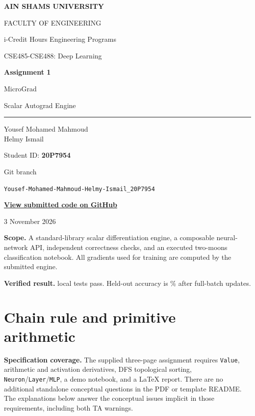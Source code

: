 \documentclass[11pt,a4paper]{article}
\newcommand{\code}[1]{\texttt{#1}}
\begin{document}
\hypersetup{pageanchor=false}
\begin{titlepage}
\centering
{\Large\bfseries AIN SHAMS UNIVERSITY\par}
{\large FACULTY OF ENGINEERING\par}
{\normalsize i-Credit Hours Engineering Programs\par}
\vspace{16mm}
{\Large CSE485-CSE488: Deep Learning\par}
\vspace{12mm}
{\Huge\bfseries\color{ink} Assignment 1\par}
\vspace{5mm}
{\LARGE MicroGrad\par}
{\Large Scalar Autograd Engine\par}
\vspace{15mm}
\rule{.8\linewidth}{.7pt}\par
\vspace{6mm}
{\Large Yousef Mohamed Mahmoud\\Helmy Ismail\par}
\vspace{4mm}
{\large Student ID: \textbf{20P7954}\par}
\vspace{7mm}
{\small Git branch\par}
{\small\nolinkurl{Yousef-Mohamed-Mahmoud-Helmy-Ismail_20P7954}\par}
\vspace{4mm}
\href{https://github.com/glacialhex/assignment-1-micrograd-template/tree/Yousef-Mohamed-Mahmoud-Helmy-Ismail_20P7954}{\textbf{View submitted code on GitHub}}\par
\vspace{9mm}
{\large 3 November 2026\par}
\vfill
\begin{minipage}{.86\linewidth}
\textbf{Scope.} A standard-library scalar differentiation engine, a composable
neural-network API, independent correctness checks, and an executed two-moons
classification notebook. All gradients used for training are computed by the
submitted engine.\par
\textbf{Verified result.} \TestCount{} local tests pass. Held-out accuracy is
\TestAccuracy\% after \EpochCount{} full-batch updates.
\end{minipage}
\end{titlepage}
\hypersetup{pageanchor=true}

\section{Chain rule and primitive arithmetic}
\textbf{Specification coverage.} The supplied three-page assignment requires
\code{Value}, arithmetic and activation derivatives, DFS topological sorting,
\code{Neuron}/\code{Layer}/\code{MLP}, a demo notebook, and a LaTeX report.
There are no additional standalone conceptual questions in the PDF or template
README. The explanations below answer the conceptual issues implicit in those
requirements, including both TA warnings.
\end{document}
